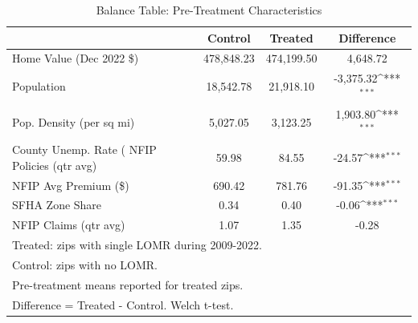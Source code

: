 \begin{table}[htbp]\centering
\def\sym#1{\ifmmode^{#1}\else\(^{#1}\)\fi}
\caption{Balance Table: Pre-Treatment Characteristics}
\label{tab:balance}
\begin{tabular}{l*{1}{ccc}}
\hline\hline
                    &     Control&     Treated&  Difference         \\
\hline
Home Value (Dec 2022 \$)&  478,848.23&  474,199.50&    4,648.72         \\
Population          &   18,542.78&   21,918.10&   -3,375.32\sym{***}\\
Pop. Density (per sq mi)&    5,027.05&    3,123.25&    1,903.80\sym{***}\\
County Unemp. Rate (%
NFIP Policies (qtr avg)&       59.98&       84.55&      -24.57\sym{***}\\
NFIP Avg Premium (\$)&      690.42&      781.76&      -91.35\sym{***}\\
SFHA Zone Share     &        0.34&        0.40&       -0.06\sym{***}\\
NFIP Claims (qtr avg)&        1.07&        1.35&       -0.28         \\
\hline\hline
\multicolumn{4}{l}{\footnotesize Treated: zips with single LOMR during 2009-2022.}\\
\multicolumn{4}{l}{\footnotesize Control: zips with no LOMR.}\\
\multicolumn{4}{l}{\footnotesize Pre-treatment means reported for treated zips.}\\
\multicolumn{4}{l}{\footnotesize Difference = Treated - Control. Welch t-test.}\\
\end{tabular}
\end{table}
